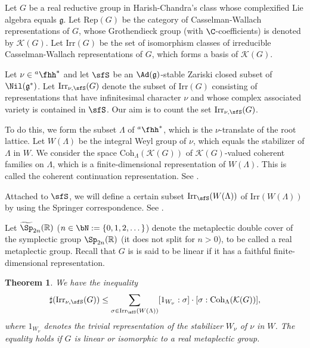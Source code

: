 \documentclass[12pt]{amsart}
\newcommand{\CK}{{\mathcal {K}}}
\newcommand{\g}{\mathfrak g}
\newcommand{\R}{\mathbb R}
\numberwithin{equation}{section}
\newtheorem{thm}{Theorem}[section]
\theoremstyle{remark}
\def\Irr{\mathrm{Irr}}
\def\hha{{}^a\fhh}
\def\Coh{\mathrm{Coh}}
\begin{document}
Let $G$ be a real reductive group in Harish-Chandra's class whose complexified Lie algebra equals $\g$. Let $\mathrm{Rep}(G)$ be the category of Casselman-Wallach representations of $G$, whose Grothendieck group (with $\C$-coefficients) is denoted by $\CK(G)$.
Let $\Irr(G)$ be the set of isomorphism classes of irreducible Casselman-Wallach representations of $G$, which forms a basis of $\CK(G)$.






Let $\nu\in \hha^*$ and let $\sfS$ be an $\Ad(\g)$-stable Zariski closed subset of $\Nil(\g^*)$. Let $\Irr_{\nu,\sfS}(G)$ denote the subset of $\Irr(G)$ consisting of  representations that have infinitesimal character $\nu$ and whose complex associated variety is  contained in $\sfS$.
Our aim is to count the set $\Irr_{\nu,\sfS}(G)$.


To do this, we form the subset $\Lambda$ of $\hha^*$, which is the $\nu$-translate of the root lattice. Let $W(\Lambda)$ be the integral Weyl group of $\nu$, which equals the stabilizer of $\Lambda$ in $W$. We consider the space $\Coh_{\Lambda}(\CK(G))$ of $\CK(G)$-valued  coherent families on $\Lambda$, which is a finite-dimensional representation of $W(\Lambda)$. This is called the coherent continuation representation. See .

Attached to $\sfS$, we will define a certain subset $\Irr_\sfS(W(\Lambda))$   of $\Irr(W(\Lambda))$  by using the Springer correspondence. See .

Let $\widetilde \Sp_{2n}(\R)$ ($n\in \bN:=\{0,1,2,\dots\}$) denote  the metaplectic double cover of the symplectic
 group $\Sp_{2n}(\R)$ (it does not split for $n>0$), to be called a real metaplectic group. Recall that $G$ is is said to be linear if it has a faithful finite-dimensional representation.

 \begin{thm}\label{Mcounteq}
 We have the inequality
  \begin{equation*}%
  \sharp(\Irr_{\nu,\sfS}(G)) \leq  \sum_{\sigma \in \Irr_\sfS(W(\Lambda))} [1_{W_{\nu}}: \sigma]\cdot [\sigma:\Coh_{\Lambda}(\CK(G))],
\end{equation*}
 where $1_{W_{\nu}}$ denotes the trivial representation of the stabilizer ${W_{\nu}}$ of $\nu$ in $W$. The equality holds if $G$ is linear or isomorphic to a real metaplectic group.
  \end{thm}
\end{document}
